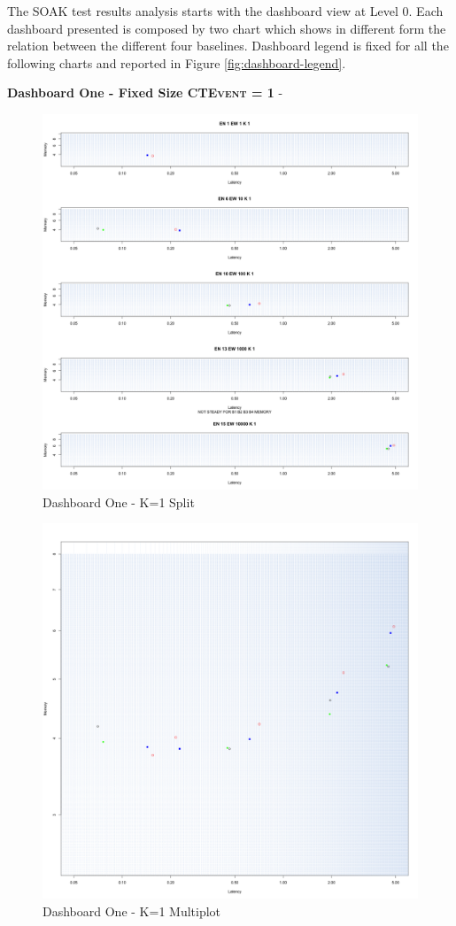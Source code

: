 The SOAK test results analysis starts with the dashboard view at Level 0. Each dashboard presented is composed by two chart which shows in different form the relation between the different four baselines. Dashboard legend is fixed for all the following charts and reported in Figure \ref{fig:dashboard-legend}.

\textbf{Dashboard One - Fixed Size \textsc{CTEvent} = 1} - 

\begin{figure}[htb]
	\centering
	\includegraphics[width=0.90\linewidth]{images/dashboard-1-split}	
	\caption{Dashboard One - K=1 Split} 
	\label{fig:result_dashboard_ka}
\end{figure}

\begin{figure}[htb]
	\centering
	\includegraphics[width=0.90\linewidth]{images/dashboard-1}	
	\caption{Dashboard One - K=1 Multiplot} 
	\label{fig:result_dashboard_kb}
\end{figure}

